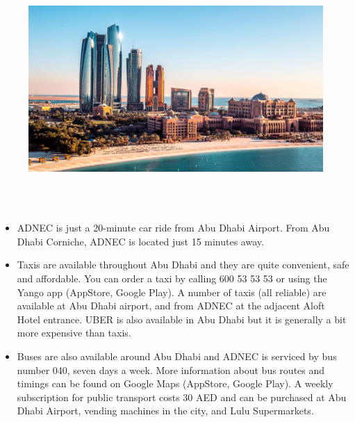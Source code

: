  \begin{figure}[h!]
  \centering
      \includegraphics[width=0.9\linewidth]{examples/handbook_coling25/local_guide/images/abu-dhabi.png}
 \end{figure}
 \leavevmode\newline

 \\

 \\

\begin{itemize}[noitemsep]
    \item ADNEC is just a 20-minute car ride from Abu Dhabi Airport. From Abu Dhabi Corniche, ADNEC is located just 15 minutes away.
    \item Taxis are available throughout Abu Dhabi and they are quite convenient, safe and affordable. You can order a taxi by calling  600 53 53 53 or using the Yango app (AppStore, Google Play). A number of taxis (all reliable) are available at Abu Dhabi airport, and from ADNEC at the adjacent Aloft Hotel entrance. UBER is also available in Abu Dhabi but it is generally a bit more expensive than taxis.
    \item Buses are also available around Abu Dhabi and ADNEC is serviced by bus number 040, seven days a week. More information about bus routes and timings can be found on Google Maps (AppStore, Google Play). A weekly subscription for public transport costs 30 AED and can be purchased at Abu Dhabi Airport, vending machines in the city, and Lulu Supermarkets.
\end{itemize}

